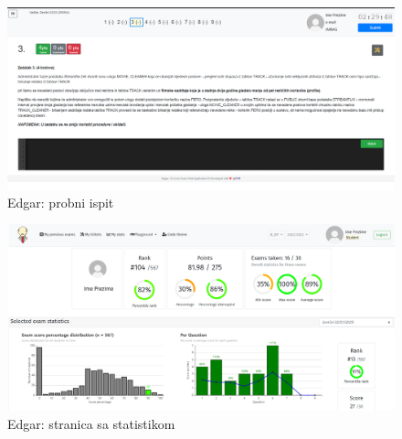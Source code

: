 		
	
		
		\begin{figure}[H]
			\includegraphics[scale=0.4]{slike/edgar3}
			\centering
			\caption{Edgar: probni ispit}
			\label{fig:ispit}
		\end{figure}
		
		\begin{figure}[H]
			\includegraphics[scale=0.4]{slike/edgar2}
			\centering
			\caption{Edgar: stranica sa statistikom}
			\label{fig:stats}
		\end{figure}
		
